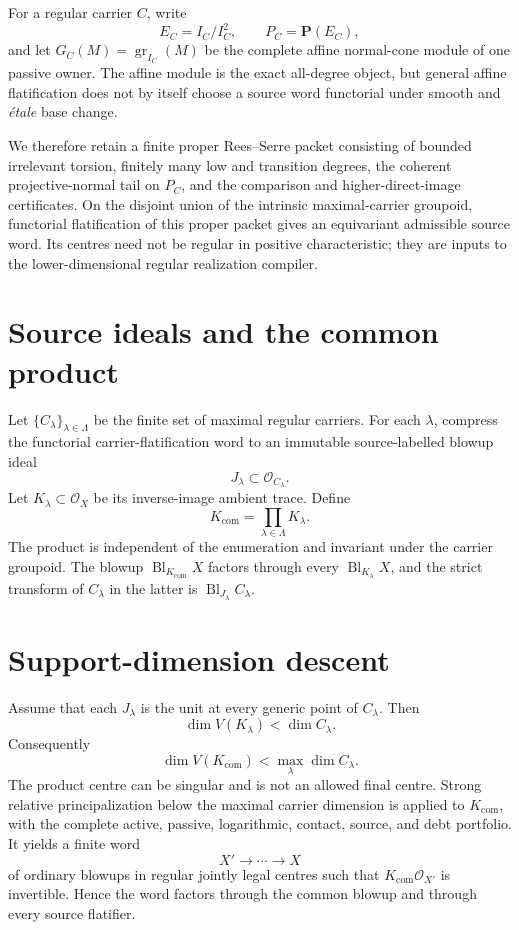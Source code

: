 \documentclass[11pt]{amsart}
\begin{document}
For a regular carrier $C$, write
\[
 E_C=I_C/I_C^2,\qquad P_C=\mathbf P(E_C),
\]
and let $G_C(M)=\operatorname{gr}_{I_C}(M)$ be the complete affine normal-cone
module of one passive owner.  The affine module is the exact all-degree object,
but general affine flatification does not by itself choose a source word
functorial under smooth and \emph{\'etale} base change.

We therefore retain a finite proper Rees--Serre packet consisting of bounded
irrelevant torsion, finitely many low and transition degrees, the coherent
projective-normal tail on $P_C$, and the comparison and higher-direct-image
certificates.  On the disjoint union of the intrinsic maximal-carrier groupoid,
functorial flatification of this proper packet gives an equivariant admissible
source word.  Its centres need not be regular in positive characteristic; they
are inputs to the lower-dimensional regular realization compiler.

\section{Source ideals and the common product}
Let $\{C_\lambda\}_{\lambda\in\Lambda}$ be the finite set of maximal regular
carriers.  For each $\lambda$, compress the functorial carrier-flatification
word to an immutable source-labelled blowup ideal
\[
 J_\lambda\subset\mathcal O_{C_\lambda}.
\]
Let $K_\lambda\subset\mathcal O_X$ be its inverse-image ambient trace.  Define
\[
 K_{\mathrm{com}}=\prod_{\lambda\in\Lambda}K_\lambda.
\]
The product is independent of the enumeration and invariant under the carrier
groupoid.  The blowup $\operatorname{Bl}_{K_{\mathrm{com}}}X$ factors through
every $\operatorname{Bl}_{K_\lambda}X$, and the strict transform of
$C_\lambda$ in the latter is $\operatorname{Bl}_{J_\lambda}C_\lambda$.

\section{Support-dimension descent}
Assume that each $J_\lambda$ is the unit at every generic point of
$C_\lambda$.  Then
\[
 \dim V(K_\lambda)<\dim C_\lambda.
\]
Consequently
\[
 \dim V(K_{\mathrm{com}})
 < \max_\lambda\dim C_\lambda.
\]
The product centre can be singular and is not an allowed final centre.  Strong
relative principalization below the maximal carrier dimension is applied to
$K_{\mathrm{com}}$, with the complete active, passive, logarithmic, contact,
source, and debt portfolio.  It yields a finite word
\[
 X'\longrightarrow\cdots\longrightarrow X
\]
of ordinary blowups in regular jointly legal centres such that
$K_{\mathrm{com}}\mathcal O_{X'}$ is invertible.  Hence the word factors through
the common blowup and through every source flatifier.
\end{document}
